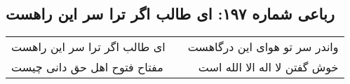 \begin{center}
\section*{رباعی شماره ۱۹۷: ای طالب اگر ترا سر این راهست}
\label{sec:0197}
\begin{longtable}{l p{0.5cm} r}
ای طالب اگر ترا سر این راهست
&&
واندر سر تو هوای این درگاهست
\\
مفتاح فتوح اهل حق دانی چیست
&&
خوش گفتن لا اله الا الله است
\\
\end{longtable}
\end{center}
